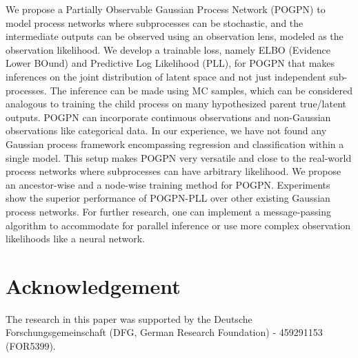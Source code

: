 We propose a Partially Observable Gaussian Process Network (POGPN) to model process networks where subprocesses can be stochastic, and the intermediate outputs can be observed using an observation lens, modeled as the observation likelihood. We develop a trainable loss, namely ELBO (Evidence Lower BOund) and Predictive Log Likelihood (PLL), for POGPN that makes inferences on the joint distribution of latent space and not just independent sub-processes. The inference can be made using MC samples, which can be considered analogous to training the child process on many hypothesized parent true/latent outputs. POGPN can incorporate continuous observations and non-Gaussian observations like categorical data. In our experience, we have not found any Gaussian process framework encompassing regression and classification within a single model. This setup makes POGPN very versatile and close to the real-world process networks where subprocesses can have arbitrary likelihood. We propose an ancestor-wise and a node-wise training method for POGPN. Experiments show the superior performance of POGPN-PLL over other existing Gaussian process networks. For further research, one can implement a message-passing algorithm to accommodate for parallel inference or use more complex observation likelihoods like a neural network.

\vspace{-1em}
\section*{Acknowledgement}
The research in this paper was supported by the Deutsche Forschungsgemeinschaft (DFG, German Research Foundation) - 459291153 (FOR5399).